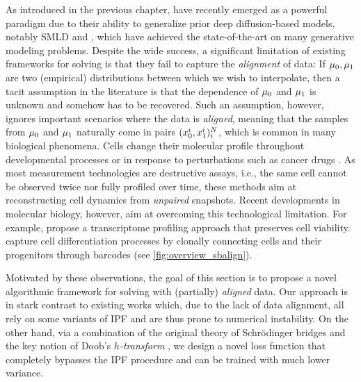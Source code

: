 As introduced in the previous chapter,  \citep{de2021diffusion,chen2021likelihood,vargas2021solving,liu2022deep} have recently emerged as a powerful paradigm due to their ability to generalize prior deep diffusion-based models, notably \acrlong{SMLD}
\citep{song2019generative,song2020score} and  \citep{ho2020denoising}, which have achieved the state-of-the-art on many generative modeling problems.
Despite the wide success, a significant limitation of existing frameworks for solving  is that they fail to capture the \emph{alignment} of data: If $\mu_0, \mu_1$ are two (empirical) distributions between which we wish to interpolate, then a tacit assumption in the literature is that the dependence of $\mu_0$ and $\mu_1$ is unknown and somehow has to be recovered. Such an assumption, however, ignores important scenarios where the data is \emph{aligned}, meaning that the samples from $\mu_0$ and $\mu_1$ naturally come in pairs $(x^i_0,x^i_1)_i^{N}$, which is common in many biological phenomena. 
Cells change their molecular profile throughout developmental processes \citep{schiebinger2019optimal,bunne2022proximal} or in response to perturbations such as cancer drugs \citep{lotfollahi2019scgen,bunne2021learning}. As most measurement technologies are destructive assays, i.e., the same cell cannot be observed twice nor fully profiled over time, these methods aim at reconstructing cell dynamics from \emph{unpaired} snapshots.
Recent developments in molecular biology, however, aim at overcoming this technological limitation. For example, \citet{chen2022live} propose a transcriptome profiling approach that preserves cell viability. \citet{weinreb2020lineage} capture cell differentiation processes by clonally connecting cells and their progenitors through barcodes (see \cref{fig:overview_sbalign}).

Motivated by these observations, the goal of this section is to propose a novel algorithmic framework for solving  with (partially) \emph{aligned} data. Our approach is in stark contrast to existing works which, due to the lack of data alignment, all rely on some variants of \acrshort{IPF} \citep{fortet1940resolution, kullback1968probability} and are thus prone to numerical instability. On the other hand, via a combination of the original theory of Schr{\"o}dinger bridges \citep{schrodinger1931umkehrung,leonard2013survey} and the key notion of Doob's \emph{$h$-transform} \citep{doob1984classical, rogers2000diffusions}, we design a novel loss function that completely bypasses the \acrshort{IPF} procedure and can be trained with much lower variance. \\


